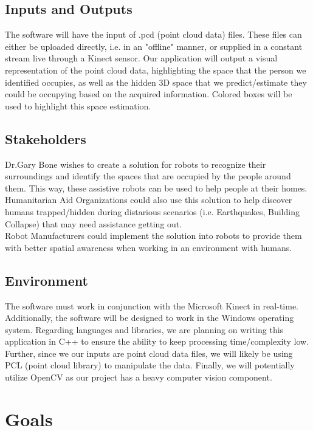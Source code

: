 \documentclass{article}
\begin{document}
\subsection{Inputs and Outputs}
The software will have the input of .pcd (point cloud data) files. These files can either be uploaded directly, i.e. in an "offline" manner, or supplied in a constant stream live through a Kinect sensor. Our application will output a visual representation of the point cloud data, highlighting the space that the person we identified occupies, as well as the hidden 3D space that we predict/estimate they could be occupying based on the acquired information. Colored boxes will be used to highlight this space estimation.


\subsection{Stakeholders}
Dr.Gary Bone wishes to create a solution for robots to recognize their surroundings and identify the spaces that are occupied by the people around them. This way, these assistive robots can be used to help people at their homes.\\

Humanitarian Aid Organizations could also use this solution to help discover humans trapped/hidden during distarious scenarios (i.e. Earthquakes, Building Collapse) that may need assistance getting out.\\

Robot Manufacturers could implement the solution into robots to provide them with better spatial awareness when working in an environment with humans.

\subsection{Environment}
The software must work in conjunction with the Microsoft Kinect in real-time. Additionally, the software will be designed to work in the Windows operating system. Regarding languages and libraries, we are planning on writing this application in C++ to ensure the ability to keep processing time/complexity low. Further, since we our inputs are point cloud data files, we will likely be using PCL (point cloud library) to manipulate the data. Finally, we will potentially utilize OpenCV as our project has a heavy computer vision component.

\newpage
\section{Goals}   
\end{document}
